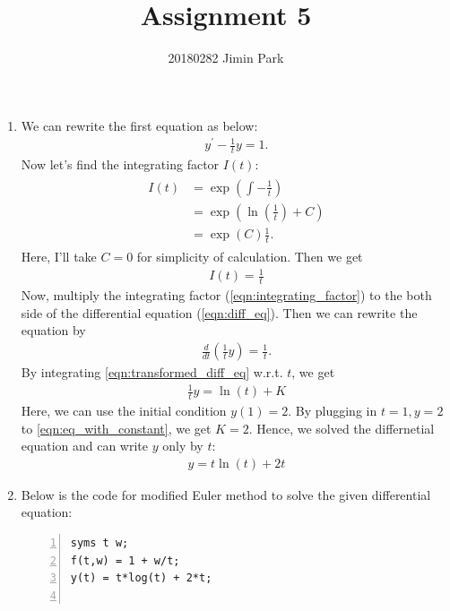 \documentclass{article}
\begin{document}
\title{Assignment 5}
\author{20180282 Jimin Park}
\maketitle


\begin{enumerate}
    \item We can rewrite the first equation as below: \begin{align}
        \label{eqn:diff_eq}
        y^\prime - \frac{1}{t}y = 1.
    \end{align} Now let's find the integrating factor $I(t)$: \begin{align*}
        \begin{split}
            I(t) &= \exp \left(\int -\frac{1}{t}\right)
            \\ &= \exp \left(\ln\left(\frac{1}{t}\right)+C\right)
            \\ &= \exp(C) \frac{1}{t}.
        \end{split}
    \end{align*} Here, I'll take $C=0$ for simplicity of calculation. Then we get \begin{align}
        \label{eqn:integrating_factor}
        I(t) = \frac{1}{t}
    \end{align} Now, multiply the integrating factor (\ref{eqn:integrating_factor}) to the both side of the differential equation (\ref{eqn:diff_eq}). Then we can rewrite the equation by \begin{align}
        \label{eqn:transformed_diff_eq}
        \frac{d}{dt}\left(\frac{1}{t}y\right) = \frac{1}{t}.
    \end{align} By integrating \ref{eqn:transformed_diff_eq} w.r.t. $t$, we get \begin{align}
        \label{eqn:eq_with_constant}
        \frac{1}{t}y = \ln(t) + K
    \end{align} Here, we can use the initial condition $y(1)=2$. By plugging in $t=1, y=2$ to \ref{eqn:eq_with_constant}, we get $K=2$. Hence, we solved the differnetial equation and can write $y$ only by $t$: \begin{align}
        \label{eqn:diff_eq_ans}
        y=t\ln(t)+2t
    \end{align}
    \item Below is the code for modified Euler method to solve the given differential equation: \begin{lstlisting}[frame=single, numbers=left, style=Matlab-editor]
syms t w;
f(t,w) = 1 + w/t;
y(t) = t*log(t) + 2*t;


\end{lstlisting}
\end{enumerate}
\end{document}
